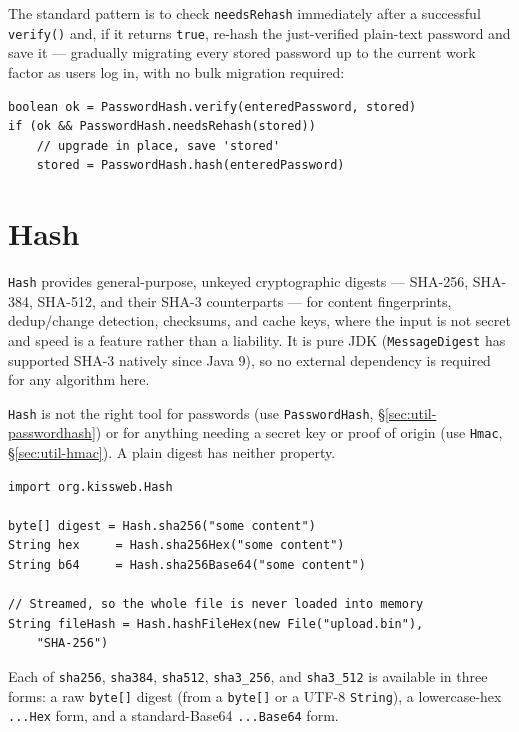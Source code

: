\noindent
The standard pattern is to check \texttt{needsRehash} immediately after a successful \texttt{verify()} and, if it returns \texttt{true}, re-hash the just-verified plain-text password and save it --- gradually migrating every stored password up to the current work factor as users log in, with no bulk migration required:

\begin{lstlisting}[style=groovy]
boolean ok = PasswordHash.verify(enteredPassword, stored)
if (ok && PasswordHash.needsRehash(stored))
    // upgrade in place, save 'stored'
    stored = PasswordHash.hash(enteredPassword)
\end{lstlisting}

\section{Hash}
\label{sec:util-hash}

\texttt{Hash} provides general-purpose, unkeyed cryptographic digests --- SHA-256, SHA-384, SHA-512, and their SHA-3 counterparts --- for content fingerprints, dedup/change detection, checksums, and cache keys, where the input is not secret and speed is a feature rather than a liability.  It is pure JDK (\texttt{MessageDigest} has supported SHA-3 natively since Java 9), so no external dependency is required for any algorithm here.

\begin{warnbox}
\texttt{Hash} is not the right tool for passwords (use \texttt{PasswordHash}, \S\ref{sec:util-passwordhash}) or for anything needing a secret key or proof of origin (use \texttt{Hmac}, \S\ref{sec:util-hmac}).  A plain digest has neither property.
\end{warnbox}

\begin{lstlisting}[style=groovy]
import org.kissweb.Hash

byte[] digest = Hash.sha256("some content")
String hex     = Hash.sha256Hex("some content")
String b64     = Hash.sha256Base64("some content")

// Streamed, so the whole file is never loaded into memory
String fileHash = Hash.hashFileHex(new File("upload.bin"),
    "SHA-256")
\end{lstlisting}

\noindent
Each of \texttt{sha256}, \texttt{sha384}, \texttt{sha512}, \texttt{sha3\_256}, and \texttt{sha3\_512} is available in three forms: a raw \texttt{byte[]} digest (from a \texttt{byte[]} or a UTF-8 \texttt{String}), a lowercase-hex \texttt{...Hex} form, and a standard-Base64 \texttt{...Base64} form.

